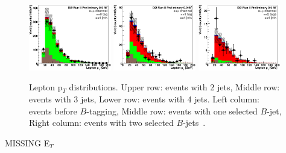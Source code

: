 \begin{figure}[!h!tbp]
\begin{center}
\includegraphics[width=0.32\textwidth]{eps/DataBackground/EMU/emu_EqZeroTag_EqFourJet_LeptonPt.eps}
\includegraphics[width=0.32\textwidth]{eps/DataBackground/EMU/emu_EqOneTag_EqFourJet_LeptonPt.eps}
\includegraphics[width=0.32\textwidth]{eps/DataBackground/EMU/emu_EqTwoTag_EqFourJet_LeptonPt.eps}
\end{center}
\vspace{-0.1in}
\caption{Lepton p$_{T}$ distributions. Upper row: events with 2 jets, Middle row: events with 3 jets, Lower row: events with 4 jets. Left column: events before $B$-tagging, Middle row: events with one selected $B$-jet, Right column: events with two selected $B$-jets~\cite{singletopnote}.}
\label{Leptonpt}
\end{figure}




\clearpage
\begin{center}
MISSING E$_{T}$
\end{center}

